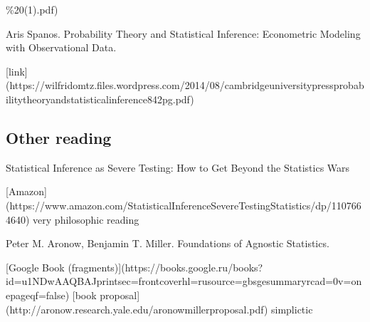 \documentclass[letterpaper,10pt,english]{sphinxmanual}
\begin{document}
\%20(1).pdf)


Aris Spanos. Probability Theory and Statistical Inference: Econometric Modeling
with Observational Data.

\begin{sphinxVerbatim}[commandchars=\\\{\}]
\PYGZhy{} [link](https://wilfridomtz.files.wordpress.com/2014/08/cambridge\PYGZhy{}university\PYGZhy{}press\PYGZhy{}probability\PYGZhy{}theory\PYGZhy{}and\PYGZhy{}statistical\PYGZhy{}inference\PYGZhy{}842pg.pdf)
\end{sphinxVerbatim}





\subsection{Other reading}
\label{\detokenize{textbook/statistics:other-reading}}
Statistical Inference as Severe Testing: How to Get Beyond the Statistics Wars

\begin{sphinxVerbatim}[commandchars=\\\{\}]
\PYGZhy{} [Amazon](https://www.amazon.com/Statistical\PYGZhy{}Inference\PYGZhy{}Severe\PYGZhy{}Testing\PYGZhy{}Statistics/dp/1107664640)
\PYGZhy{} very philosophic reading
\end{sphinxVerbatim}

Peter M. Aronow, Benjamin T. Miller. Foundations of Agnostic Statistics.

\begin{sphinxVerbatim}[commandchars=\\\{\}]
\PYGZhy{} [Google Book (fragments)](https://books.google.ru/books?id=u1N\PYGZhy{}DwAAQBAJ\PYGZam{}printsec=frontcover\PYGZam{}hl=ru\PYGZam{}source=gbs\PYGZus{}ge\PYGZus{}summary\PYGZus{}r\PYGZam{}cad=0\PYGZsh{}v=onepage\PYGZam{}q\PYGZam{}f=false)
\PYGZhy{} [book proposal](http://aronow.research.yale.edu/aronowmillerproposal.pdf)
\PYGZhy{} simplictic
\end{sphinxVerbatim}
\end{document}
